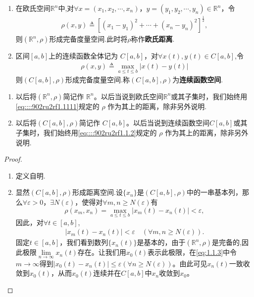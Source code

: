 \documentclass[../../main.tex]{subfiles}%
\begin{document}
\begin{theorem}[常见的度量空间]\label{theorem:常见的度量空间}
\begin{enumerate}
\item 在欧氏空间$\mathbb{R}^n$中,对$\forall x=(x_1,x_2,\cdots,x_n)$，$y=(y_1,y_2,\cdots,y_n)\in \mathbb{R}^n$，令
\begin{align}\label{eq::::902ru2rf1.1111}
\rho(x,y)\triangleq\left[(x_1 - y_1)^2 + \cdots + (x_n - y_n)^2\right]^{\frac{1}{2}},
\end{align}
则$(\mathbb{R}^n,\rho)$形成完备度量空间.此时将$\rho$称作\textbf{欧氏距离}.

\item 区间$[a,b]$上的连续函数全体记为 $C[a,b]$，对$\forall x(t),y(t)\in C[a,b]$,令
\begin{align}
\label{eq::::902ru2rf1.1.2}
\rho(x,y) \triangleq \max_{a \leqslant t \leqslant b} |x(t) - y(t)|
\end{align}
则$(C[a,b],\rho)$形成完备度量空间.称$(C[a,b],\rho)$为\textbf{连续函数空间}.
\end{enumerate}
\end{theorem}
\begin{remark}
\begin{enumerate}
\item 以后将$(\mathbb{R}^n,\rho)$简记作 $\mathbb{R}^n$。以后当说到欧氏空间$\mathbb{R}^n$或其子集时，我们始终用\eqref{eq::::902ru2rf1.1111}规定的 $\rho$ 作为其上的距离，除非另外说明.

\item 以后将$(C[a,b],\rho)$简记作 $C[a,b]$。以后当说到连续函数空间$C[a,b]$或其子集时，我们始终用\eqref{eq::::902ru2rf1.1.2}规定的 $\rho$ 作为其上的距离，除非另外说明.
\end{enumerate}
\end{remark}
\begin{proof}
\begin{enumerate}
\item 定义自明.

\item 显然$(C[a,b],\rho)$形成距离空间.设$\{x_n\}$是$(C[a,b],\rho)$中的一串基本列，那么$\forall \varepsilon>0$，$\exists N(\varepsilon)$，使得对$\forall m,n\geqslant N(\varepsilon)$有
$$\rho(x_m,x_n)=\max_{a\leqslant t\leqslant b}|x_m(t)-x_n(t)|<\varepsilon,$$
因此，对$\forall t\in [a,b]$,
\begin{align}
\label{eq:1.1.3}
|x_m(t)-x_n(t)|<\varepsilon \quad (\forall m,n\geqslant N(\varepsilon)).
\end{align}
固定$t\in [a,b]$，我们看到数列$\{x_n(t)\}$是基本的，由于$(\mathbb{R}^n,\rho)$是完备的,因此极限$\lim\limits_{n\to \infty} x_n(t)$存在。让我们用$x_0(t)$表示此极限，在\eqref{eq:1.1.3}中令$m\to \infty$得到$|x_0(t)-x_n(t)|\leqslant \varepsilon (\forall n\geqslant N(\varepsilon))$。由此可见$x_n(t)$一致收敛到$x_0(t)$，从而$x_0(t)$连续并在$C[a,b]$中$x_n$收敛到$x_0$。
\end{enumerate}

\end{proof}
\end{document}
